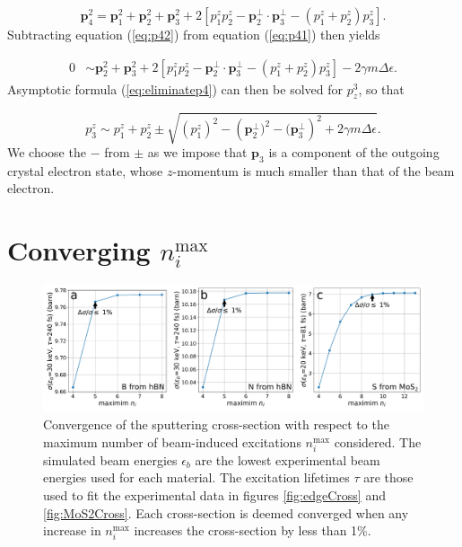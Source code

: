 \documentclass{article}
\begin{document}
\begin{equation}
  \mathbf{p}_4^2
  =
  \mathbf{p}_1^2 + \mathbf{p}_2^2 + \mathbf{p}_3^2
  + 2\left[
  p^z_1p^z_2 - \mathbf{p}^{\perp}_2 \cdot \mathbf{p}^{\perp}_3 
    - (p^z_1 + p^z_2)p^z_3
  \right].
  \label{eq:p42}
\end{equation}
%
Subtracting equation (\ref{eq:p42}) from equation (\ref{eq:p41}) then yields

\begin{equation}
\label{eq:eliminatep4}
\begin{aligned}
    0
    &\sim
    \mathbf{p}_2^2 + \mathbf{p}_3^2
    +
    2\left[
    p^z_1p^z_2 - \mathbf{p}^{\perp}_2 \cdot \mathbf{p}^{\perp}_3 - (p^z_1 + p^z_2)p^z_3
    \right]
    -
    2\gamma m\Delta\epsilon.
\end{aligned}
\end{equation}
%
Asymptotic formula (\ref{eq:eliminatep4}) can then be solved for $p^3_z$, so that

\begin{equation}
\label{eq:p3z}
    p_3^z
    \sim
    p_1^z + p_2^z
    \pm
    \sqrt{
    \left(p_1^z\right)^2
    -
    \left(\mathbf{p}_2^\perp)^2 - (\mathbf{p}_3^\perp\right)^2
    +
    2\gamma m\Delta\epsilon
    }.
\end{equation}
%
We choose the $-$ from $\pm$ as we impose that $\mathbf{p}_3$ is a
component of the outgoing crystal electron state, whose $z$-momentum is much
smaller than that of the beam electron.

\pagebreak
\section{Converging $n_i^\text{max}$}
\label{app:nimax}

\begin{figure}[H]
  \centering
  \includegraphics[width=\textwidth]{figS1.pdf}
  \caption{
    Convergence of the sputtering cross-section with respect to the maximum
    number of beam-induced excitations $n_i^\text{max}$ considered.
    The simulated beam energies $\epsilon_b$ are the lowest experimental beam
    energies used for each material.
    The excitation lifetimes $\tau$ are those used to fit the experimental data
    in figures \ref{fig:edgeCross} and \ref{fig:MoS2Cross}.
    Each cross-section is deemed converged when any increase in $n_i^\text{max}$
    increases the cross-section by less than 1\%.
  }
  \label{fig:nimax}
\end{figure}
\end{document}
